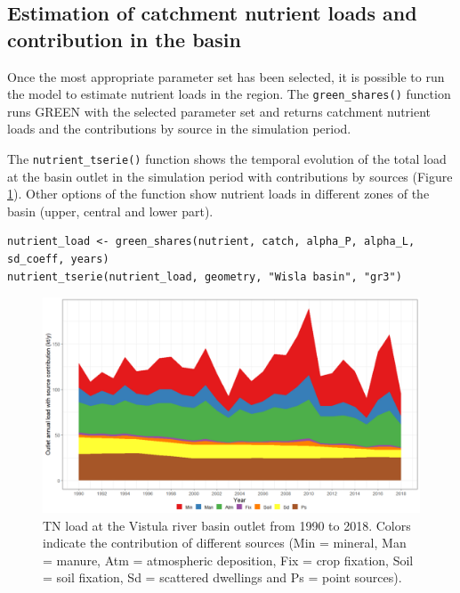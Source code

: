 \hypertarget{estimation-of-catchment-nutrient-loads-and-contribution-in-the-basin}{%
\subsection{Estimation of catchment nutrient loads and contribution in the basin}\label{estimation-of-catchment-nutrient-loads-and-contribution-in-the-basin}}

Once the most appropriate parameter set has been selected, it is possible to run the model to estimate nutrient loads in the region. The \texttt{green\_shares()} function runs GREEN with the selected parameter set and returns catchment nutrient loads and the contributions by source in the simulation period.

The \texttt{nutrient\_tserie()} function shows the temporal evolution of the total load at the basin outlet in the simulation period with contributions by sources (Figure \ref{fig:total-TN-vistula-river}). Other options of the function show nutrient loads in different zones of the basin (upper, central and lower part).

\begin{verbatim}
nutrient_load <- green_shares(nutrient, catch, alpha_P, alpha_L, sd_coeff, years)
nutrient_tserie(nutrient_load, geometry, "Wisla basin", "gr3")
\end{verbatim}

\begin{figure}[H]
\includegraphics[width=0.9\linewidth,height=0.25\textheight]{figures/fig8} \caption{TN load at the Vistula river basin outlet from 1990 to 2018. Colors indicate the contribution of different sources (Min = mineral, Man = manure, Atm = atmospheric deposition, Fix = crop fixation, Soil = soil fixation, Sd = scattered dwellings and Ps = point sources).}\label{fig:total-TN-vistula-river}
\end{figure}

